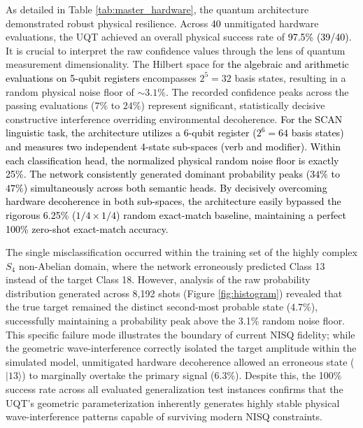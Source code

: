 \documentclass[11pt, a4paper]{article}
\begin{document}
As detailed in Table \ref{tab:master_hardware}, the quantum architecture demonstrated robust physical resilience. Across \textcolor{black}{40} unmitigated hardware evaluations, the UQT achieved an overall physical success rate of \textcolor{black}{97.5\% (39/40)}. It is crucial to interpret the raw confidence values through the lens of quantum measurement dimensionality. The Hilbert space for \textcolor{black}{the algebraic and arithmetic evaluations on 5-qubit registers} encompasses $2^5 = 32$ basis states, resulting in a random physical noise floor of $\sim 3.1\%$. The recorded confidence peaks across the passing evaluations ($7\%$ to $24\%$) represent significant, statistically decisive constructive interference overriding environmental decoherence. \textcolor{black}{For the SCAN linguistic task, the architecture utilizes a 6-qubit register ($2^6 = 64$ basis states) and measures two independent 4-state sub-spaces (verb and modifier). Within each classification head, the normalized physical random noise floor is exactly 25\%. The network consistently generated dominant probability peaks ($34\%$ to $47\%$) simultaneously across both semantic heads. By decisively overcoming hardware decoherence in both sub-spaces, the architecture easily bypassed the rigorous 6.25\% ($1/4 \times 1/4$) random exact-match baseline, maintaining a perfect 100\% zero-shot exact-match accuracy.}

The single misclassification occurred within the training set of the highly complex $S_4$ non-Abelian domain, where the network erroneously predicted Class 13 instead of the target Class 18. However, analysis of the raw probability distribution generated across 8,192 shots (Figure \ref{fig:histogram}) revealed that the true target remained the distinct second-most probable state (4.7\%), successfully maintaining a probability peak above the 3.1\% random noise floor. This specific failure mode illustrates the boundary of current NISQ fidelity; while the geometric wave-interference correctly isolated the target amplitude within the simulated model, unmitigated hardware decoherence allowed an erroneous state ($|13\rangle$) to marginally overtake the primary signal (6.3\%). Despite this, the 100\% success rate across all evaluated generalization test instances confirms that the UQT's geometric parameterization inherently generates highly stable physical wave-interference patterns capable of surviving modern NISQ constraints.
\end{document}
